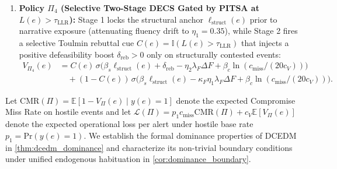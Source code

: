 \documentclass[11pt,a4paper]{article}
\begin{document}
\begin{enumerate}
  \item \textbf{Policy $\Pi_4$ (Selective Two-Stage DECS Gated by PITSA at $L(e) > \tau_{\text{LLR}}$):} Stage 1 locks the structural anchor $\ell_{\text{struct}}(e)$ prior to narrative exposure (attenuating fluency drift to $\eta_1 = 0.35$), while Stage 2 fires a selective Toulmin rebuttal cue $C(e) = \mathbb{I}(L(e) > \tau_{\text{LLR}})$ that injects a positive defeasibility boost $\delta_{\text{reb}} > 0$ only on structurally contested events:
  \begin{equation}
  \label{eq:pi4}
  \begin{aligned}
  V_{\Pi_4}(e) &= C(e)\,\sigma\bigl(\beta_s \ell_{\text{struct}}(e) + \delta_{\text{reb}} - \eta_2 \lambda_F \Delta F + \beta_c \ln(c_{\text{miss}} / (20 c_V))\bigr) \\
  &\quad + (1 - C(e))\,\sigma\bigl(\beta_s \ell_{\text{struct}}(e) - \kappa_F \eta_1 \lambda_F \Delta F + \beta_c \ln(c_{\text{miss}} / (20 c_V))\bigr).
  \end{aligned}
  \end{equation}
\end{enumerate}

Let $\text{CMR}(\Pi) = \mathbb{E}[1 - V_{\Pi}(e) \mid y(e) = 1]$ denote the expected Compromise Miss Rate on hostile events and let $\mathcal{L}(\Pi) = p_1 c_{\text{miss}} \text{CMR}(\Pi) + c_V \mathbb{E}[V_{\Pi}(e)]$ denote the expected operational loss per alert under hostile base rate $p_1 = \text{Pr}(y(e) = 1)$. We establish the formal dominance properties of DCEDM in \cref{thm:dcedm_dominance} and characterize its non-trivial boundary conditions under unified endogenous habituation in \cref{cor:dominance_boundary}.
\end{document}
